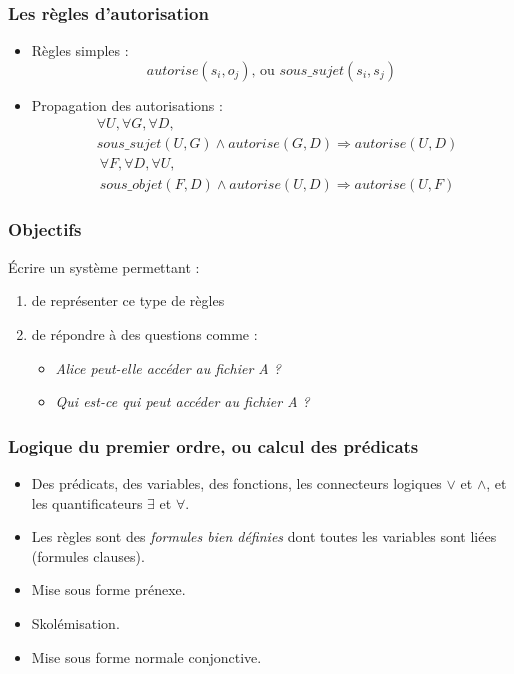 \documentclass[aspectratio=43]{beamer}
\begin{document}
\begin{frame}
\frametitle{Les règles d'autorisation}
\begin{itemize}
  \item Règles simples :
      $$autorise(s_{i}, o_{j})\textrm{, ou }sous\_sujet(s_{i}, s_{j})$$
  \item Propagation des autorisations :
    \begin{align*}
      &\forall U, \forall G, \forall D, \\
      &sous\_sujet(U, G) \wedge autorise(G, D) \Rightarrow autorise(U, D)
      \end{align*}
    \begin{align*}
      &\forall F, \forall D, \forall U, \\
      &sous\_objet(F, D) \wedge autorise(U, D) \Rightarrow autorise(U, F)
      \end{align*}
\end{itemize}

\end{frame}

\begin{frame}
\frametitle{Objectifs}

Écrire un système permettant :
\begin{enumerate}
  \item de représenter ce type de règles
  \item de répondre à des questions comme :
    \begin{itemize}
      \item \it{Alice peut-elle accéder au fichier A ?}
      \item \it{Qui est-ce qui peut accéder au fichier A ?}
    \end{itemize}
\end{enumerate}
\end{frame}

\begin{frame}
\frametitle{Logique du premier ordre, ou calcul des prédicats}

\begin{itemize}
\item Des prédicats, des variables, des fonctions, les connecteurs logiques $\vee$ et $\wedge$, et les quantificateurs $\exists$ et $\forall$.

\item Les règles sont des \textit{formules bien définies} dont toutes les variables sont liées (formules clauses).

\item Mise sous forme prénexe.

\item Skolémisation.

\item Mise sous forme normale conjonctive.
\end{itemize}
\end{frame}
\end{document}

